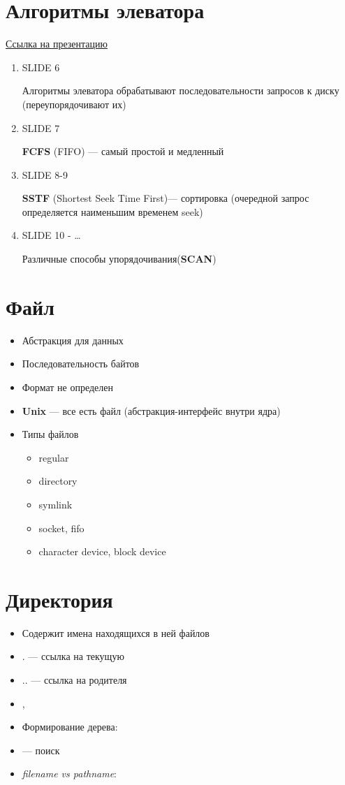 \documentclass[../../lectures.tex]{subfiles}
\begin{document}
\section{Алгоритмы элеватора}
\textcolor{blue}{\href{https://slideplayer.com/slide/5209336}{Ссылка на презентацию}}
\begin{enumerate}
    \item SLIDE 6
        
          Алгоритмы элеватора обрабатывают последовательности запросов к диску (переупорядочивают их)
    \item SLIDE 7

          \textbf{FCFS} (FIFO) --- самый простой и медленный
    \item SLIDE 8-9

          \textbf{SSTF} (Shortest Seek Time First)--- сортировка (очередной запрос определяется наименьшим временем seek)
    \item SLIDE 10 - \dots

          Различные способы упорядочивания(\textbf{SCAN})
\end{enumerate}

\section{Файл}
\begin{itemize}
    \item Абстракция для данных
    \item Последовательность байтов
    \item Формат не определен
    \item \textbf{Unix} --- все есть файл (абстракция-интерфейс внутри ядра)
    \item Типы файлов 
          \begin{itemize}
            \item regular
            \item directory
            \item symlink
            \item socket, fifo
            \item character device, block device
          \end{itemize}
\end{itemize}

\section{Директория}
\begin{itemize}
    \item Содержит имена находящихся в ней файлов
    \item $.$ --- ссылка на текущую
    \item $..$ --- ссылка на родителя
    \item {}, 
    \item Формирование дерева: 
    \item {} --- поиск
    \item \emph{filename vs pathname}: 
\end{itemize}
\end{document}
